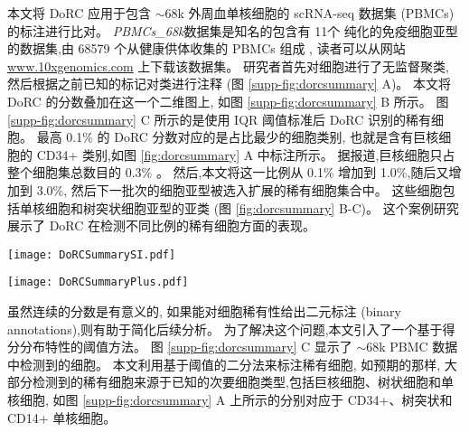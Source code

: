 本文将 DoRC 应用于包含 ${\sim}68$k 外周血单核细胞的 scRNA-seq 数据集 (PBMCs) 的标注进行比对。
 \textit{PBMCs\_68k}数据集是知名的包含有 11个 纯化的免疫细胞亚型的数据集,由 68579 个从健康供体收集的 PBMCs 组成 ,
读者可以从网站 \url{www.10xgenomics.com} 上下载该数据集。
研究者首先对细胞进行了无监督聚类,
然后根据之前已知的标记对类进行注释 (图 \ref{supp-fig:dorcsummary} A)。
本文将 DoRC 的分数叠加在这一个二维图上, 如图 \ref{supp-fig:dorcsummary} B 所示。
图 \ref{supp-fig:dorcsummary} C 所示的是使用 IQR 阈值标准后 DoRC 识别的稀有细胞。
最高 0.1\% 的 DoRC 分数对应的是占比最少的细胞类别, 
也就是含有巨核细胞的 CD34+ 类别,如图 \ref{fig:dorcsummary} A 中标注所示。
据报道,巨核细胞只占整个细胞集总数目的 0.3\% 。
然后,本文将这一比例从 0.1\% 增加到 1.0\%,随后又增加到 3.0\%,
然后下一批次的细胞亚型被选入扩展的稀有细胞集合中。
这些细胞包括单核细胞和树突状细胞亚型的亚类 (图 \ref{fig:dorcsummary} B-C)。
这个案例研究展示了 DoRC 在检测不同比例的稀有细胞方面的表现。

\begin{figure*}[!htbp]
    \centering
    \texttt{[image: DoRCSummarySI.pdf]}
    \caption{
    DoRC 在 PBMCs\_68k 上的性能评估
    }
    \label{supp-fig:dorcsummary}
\end{figure*}

\begin{figure*}[!htbp]
    \centering
    \texttt{[image: DoRCSummaryPlus.pdf]}
    \caption{
    DoRC 发现了不同稀有度的细胞
    }
    \label{fig:dorcsummary}
\end{figure*}

虽然连续的分数是有意义的,
如果能对细胞稀有性给出二元标注 (binary annotations),则有助于简化后续分析。
为了解决这个问题,本文引入了一个基于得分分布特性的阈值方法。
图 \ref{supp-fig:dorcsummary} C 显示了 ${\sim}68$k PBMC 数据中检测到的细胞。
本文利用基于阈值的二分法来标注稀有细胞,
如预期的那样,
大部分检测到的稀有细胞来源于已知的次要细胞类型,包括巨核细胞、树状细胞和单核细胞,
如图 \ref{supp-fig:dorcsummary} A 上所示的分别对应于 CD34+、树突状和 CD14+ 单核细胞。


